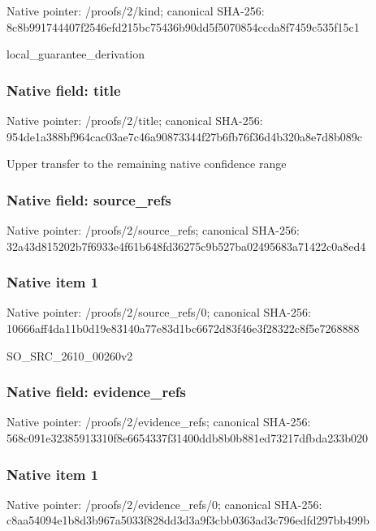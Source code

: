 \documentclass[10pt,a4paper]{article}
\begin{document}
Native pointer: /proofs/2/kind; canonical SHA-256: 8c8b991744407f2546efd215\allowbreak{}bc75436b90dd5f5070854ccd\allowbreak{}a8f7459c535f15c1


local\_guarantee\_derivation


\subsubsection{Native field: title}


Native pointer: /proofs/2/title; canonical SHA-256: 954de1a388bf964cac03ae7c\allowbreak{}46a90873344f27b6fb76f36d\allowbreak{}4b320a8e7d8b089c


Upper transfer to the remaining native confidence range


\subsubsection{Native field: source\_refs}


Native pointer: /proofs/2/source\_refs; canonical SHA-256: 32a43d815202b7f6933e4f61\allowbreak{}b648fd36275c9b527ba02495\allowbreak{}683a71422c0a8ed4



\subsubsection{Native item 1}


Native pointer: /proofs/2/source\_refs/0; canonical SHA-256: 10666aff4da11b0d19e83140\allowbreak{}a77e83d1bc6672d83f46e3f2\allowbreak{}8322c8f5e7268888


SO\_SRC\_2610\_00260v2


\subsubsection{Native field: evidence\_refs}


Native pointer: /proofs/2/evidence\_refs; canonical SHA-256: 568c091e32385913310f8e66\allowbreak{}54337f31400ddb8b0b881ed7\allowbreak{}3217dfbda233b020



\subsubsection{Native item 1}


Native pointer: /proofs/2/evidence\_refs/0; canonical SHA-256: c8aa54094e1b8d3b967a5033\allowbreak{}f828dd3d3a9f3cbb0363ad3c\allowbreak{}796edfd297bb499b
\end{document}
